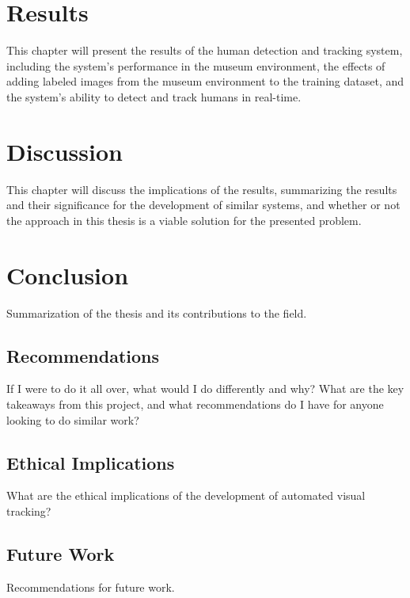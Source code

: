 \section{Results}
\label{sec:results}
This chapter will present the results of the human detection and tracking system, including the system's performance in the museum environment, the effects of adding labeled images from the museum environment to the training dataset, and the system's ability to detect and track humans in real-time.

\label{sec:heatmaps}

\section{Discussion}
This chapter will discuss the implications of the results, summarizing the results and their significance for the development of similar systems, and whether or not the approach in this thesis is a viable solution for the presented problem. 

\section{Conclusion}
Summarization of the thesis and its contributions to the field.

\subsection{Recommendations}
\label{sec:training}
If I were to do it all over, what would I do differently and why? What are the key takeaways from this project, and what recommendations do I have for anyone looking to do similar work?

\subsection{Ethical Implications}
What are the ethical implications of the development of automated visual tracking?
\label{sec:deployment}

\subsection{Future Work}
Recommendations for future work.

